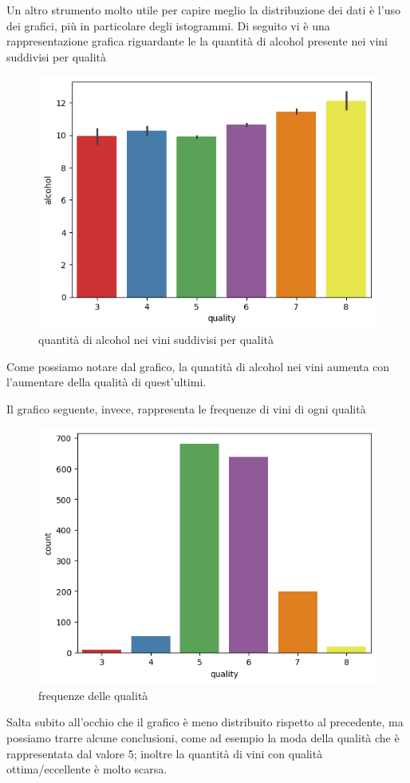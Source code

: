 \documentclass{article}
\begin{document}
\begin{titlepage}
        \newpage
        Un altro strumento molto utile per capire meglio la distribuzione dei dati è l'uso dei grafici, più in particolare degli istogrammi. Di seguito vi è una rappresentazione grafica riguardante le la quantità di alcohol presente nei vini suddivisi per qualità

        \begin{figure}[ht]
            \centering
            \includegraphics[width=0.5\linewidth]{barPlot-alcohol.png}
            \caption{ quantità di alcohol nei vini suddivisi per qualità}
            \label{fig:enter-label}
        \end{figure}

        Come possiamo notare dal grafico, la qunatità di alcohol nei vini aumenta con l'aumentare della qualità di quest'ultimi.
        
        Il grafico seguente, invece, rappresenta le frequenze di vini di ogni qualità
        
        \begin{figure}[ht]
            \centering
            \includegraphics[width=0.5\linewidth]{countPlot-quality.png}
            \caption{ frequenze delle qualità}
            \label{fig:enter-label}
        \end{figure}

        Salta subito all'occhio che il grafico è meno distribuito rispetto al precedente, ma possiamo trarre alcune conclusioni, come ad esempio la moda della qualità che è rappresentata dal valore 5; inoltre la quantità di vini con qualità ottima/eccellente è molto scarsa.


\end{titlepage}
\end{document}
